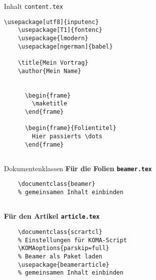 \begin{Frame}[fragile]{Inhalt \texttt{content.tex}}
  \begin{lstlisting}[gobble=4]
    \usepackage[utf8]{inputenc}
    \usepackage[T1]{fontenc}
    \usepackage{lmodern}
    \usepackage[ngerman]{babel}

    \title{Mein Vortrag}
    \author{Mein Name}

    
      \begin{frame}
        \maketitle
      \end{frame}

      \begin{frame}{Folientitel}
        Hier passierts \dots
      \end{frame}
    
  \end{lstlisting}
\end{Frame}

\begin{Frame}[fragile]{Dokumentenklassen}
  \textbf{\color{maincolor}Für die Folien \texttt{beamer.tex}}
  \begin{lstlisting}[gobble=4]
    % Beamer als Dokumentenklasse verwenden
    \documentclass{beamer}
    % gemeinsamen Inhalt einbinden
    
  \end{lstlisting}

  \xxx

  \textbf{\color{maincolor}Für den Artikel \texttt{article.tex}}
  \begin{lstlisting}[gobble=4]
    % KOMA-Script als Dokumentenklasse verwenden
    \documentclass{scrartcl}
    % Einstellungen für KOMA-Script
    \KOMAoptions{parskip=full}
    % Beamer als Paket laden
    \usepackage{beamerarticle}
    % gemeinsamen Inhalt einbinden
    
  \end{lstlisting}
\end{Frame}

